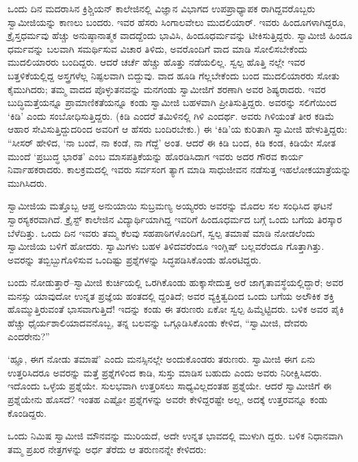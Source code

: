 ಒಂದು ದಿನ ಮದರಾಸಿನ ಕ್ರಿಶ್ಚಿಯನ್ ಕಾಲೇಜಿನಲ್ಲಿ ವಿಜ್ಞಾನ ವಿಭಾಗದ ಉಪಪ್ರಾಧ್ಯಾಪಕ ರಾಗಿದ್ದವರೊಬ್ಬರು ಸ್ವಾಮೀಜಿಯನ್ನು ಕಾಣಲು ಬಂದರು. ಇವರ ಹೆಸರು ಸಿಂಗಾಲವೇಲು ಮುದಲಿಯಾರ್. ಇವರು ಹಿಂದೂಗಳಾಗಿದ್ದರೂ, ಕ್ರೈಸ್ತಧರ್ಮವು ಹೆಚ್ಚು ಅನುಷ್ಠಾನಾತ್ಮಕ ವಾದದ್ದೆಂದು ಭಾವಿಸಿ, ಹಿಂದೂಧರ್ಮವನ್ನು ಟೀಕಿಸುತ್ತಿದ್ದರು. ಸ್ವಾಮೀಜಿ ಹಿಂದೂ ಧರ್ಮವನ್ನು ಬಲವಾಗಿ ಸಮರ್ಥಿಸುವ ವಿಚಾರ ತಿಳಿದು, ಅವರೊಂದಿಗೆ ವಾದ ಮಾಡಿ ಸೋಲಿಸಬೇಕೆಂದು ಮುದಲಿಯಾರರು ಬಂದಿದ್ದರು. ಆದರೆ ಚರ್ಚೆ ಹೆಚ್ಚು ಹೊತ್ತು ನಡೆಯಲಿಲ್ಲ. ಸ್ವಲ್ಪ ಹೊತ್ತಿ ನಲ್ಲೇ ಇವರ ಬತ್ತಳಿಕೆಯಲ್ಲಿದ್ದ ಅಸ್ತ್ರಗಳೆಲ್ಲ ನಿಷ್ಫಲವಾಗಿ ಬಿದ್ದುವು. ವಾದ ಹೂಡಿ ಗೆಲ್ಲಬೇಕೆಂದು ಬಂದ ಮುದಲಿಯಾರರು ಸೋತು ಕೈಮುಗಿದರು; ತಮ್ಮ ವಾದದ ಪೊಳ್ಳುತನವನ್ನು ಮನಗಂಡು ಸ್ವಾಮೀಜಿಗೆ ಶರಣಾಗಿ ಅವರ ಶಿಷ್ಯರಾದರು. ಇವರ ಬುದ್ಧಿಮತ್ತೆಯನ್ನೂ ಪ್ರಾಮಾಣಿಕತೆಯನ್ನೂ ಕಂಡು ಸ್ವಾಮೀಜಿ ಬಹಳವಾಗಿ ಪ್ರೀತಿಸುತ್ತಿದ್ದರು. ಅವರನ್ನು ಸಲಿಗೆಯಿಂದ ‘ಕಿಡಿ’ ಎಂದು ಸಂಬೋಧಿಸುತ್ತಿದ್ದರು. (ಕಿಡಿ ಎಂದರೆ ತಮಿಳಿನಲ್ಲಿ ಗಿಳಿ ಎಂದರ್ಥ. ಅವರು ಗಿಳಿಯಂತೆ ತೀರ ಕಡಿಮೆ ಆಹಾರ ಸೇವಿಸುತ್ತಿದ್ದುದರಿಂದ ಅವರಿಗೆ ಆ ಹೆಸರು ಬಂದಿರಬೇಕು.) ಈ ‘ಕಿಡಿ’ಯ ಕುರಿತಾಗಿ ಸ್ವಾಮೀಜಿ ಹೇಳುತ್ತಿದ್ದರು: “ಸೀಸರ್ ಹೇಳಿದ, ‘ನಾ ಬಂದೆ, ನಾ ಕಂಡೆ, ನಾ ಗೆದ್ದೆ’ ಅಂತ. ಆದರೆ ಈ ಕಿಡಿ ಬಂದ, ಕಿಡಿ ಕಂಡ, ಕಿಡಿಯೇ ಸೋತ  ಮುಂದೆ ‘ಪ್ರಬುದ್ಧ ಭಾರತ’ ಎಂಬ ಮಾಸಪತ್ರಿಕೆಯನ್ನು ಹೊರಡಿಸಿದಾಗ ಇವರು ಅದರ ಗೌರವ ಕಾರ್ಯ ನಿರ್ವಾಹಕರಾದರು. ಕಾಲಕ್ರಮದಲ್ಲಿ ಇವರು ಸರ್ವಸಂಗ ತ್ಯಾಗ ಮಾಡಿ ಸಾಧುಜೀವನ ನಡೆಸುತ್ತ ಇಹಲೋಕಯಾತ್ರೆಯನ್ನು ಮುಗಿಸಿದರು.

ಸ್ವಾಮೀಜಿಯ ಮತ್ತೊಬ್ಬ ಆಪ್ತ ಅನುಯಾಯಿ ಸುಬ್ರಮಣ್ಯ ಅಯ್ಯರರು ಅವರನ್ನು ಮೊದಲ ಸಲ ಸಂಧಿಸಿದ ಘಟನೆ ಸ್ವಾರಸ್ಯಕರವಾಗಿದೆ. ಕ್ರೈಸ್ಟ್ ಕಾಲೇಜಿನ ವಿದ್ಯಾರ್ಥಿಯಾಗಿದ್ದ ಇವರಿಗೆ ಹಿಂದೂಧರ್ಮದ ಬಗ್ಗೆ ಒಂದು ಬಗೆಯ ತಿರಸ್ಕಾರ ಬೆಳೆದಿತ್ತು. ಒಂದು ದಿನ ಇವರು ತಮ್ಮ ಕೆಲವು ಸಹಪಾಠಿಗಳೊಂದಿಗೆ, ಸ್ವಲ್ಪ ತಮಾಷೆ ಮಾಡಿ ನೋಡಲೆಂದು ಸ್ವಾಮೀಜಿಯ ಬಳಿಗೆ ಹೋದರು. ಸ್ವಾಮಿಗಳು ಬಹಳ ತಿಳಿದವರೆಂದೂ ಇಂಗ್ಲಿಷ್ ಬಲ್ಲವರೆಂದೂ ಗೊತ್ತಾಗಿತ್ತು. ಅವರನ್ನು ತಬ್ಬಿಬ್ಬುಗೊಳಿಸುವ ಒಂದಿಷ್ಟು ಪ್ರಶ್ನೆಗಳನ್ನು ಸಿದ್ಧಪಡಿಸಿಕೊಂಡು ಹೊರಟಿದ್ದರು.

ಬಂದು ನೋಡುತ್ತಾರೆ–ಸ್ವಾಮೀಜಿ ಕುರ್ಚಿಯಲ್ಲಿ ಒರಗಿಕೊಂಡು ಹುಕ್ಕಾಸೇದುತ್ತ ಅರೆ ಜಾಗೃತಾವಸ್ಥೆಯಲ್ಲಿದ್ದಾರೆ; ಅವರ ಮನಸ್ಸು ಯಾವುದೋ ಉನ್ನತ ಪ್ರಜ್ಞೆಯ ಹಂತದಲ್ಲಿ ದ್ದಂತಿದೆ; ಅವರ ವ್ಯಕ್ತಿತ್ವದಿಂದ ಒಂದು ಬಗೆಯ ಅಲೌಕಿಕ ಶಕ್ತಿ ಹೊಮ್ಮುತ್ತಿರುವಂತೆ ಭಾಸವಾಗುತ್ತಿದೆ! ಇದನ್ನು ಕಂಡು ಈ ತರುಣರು ಏಕೋ ಸ್ವಲ್ಪ ಹಿಮ್ಮೆಟ್ಟಿದರು. ಬಳಿಕ ಅವರ ಪೈಕಿ ಹೆಚ್ಚು ಧೈರ್ಯಶಾಲಿಯಾದವನೊಬ್ಬ, ತನ್ನ ಬಲವನ್ನು ಒಗ್ಗೂಡಿಸಿಕೊಂಡು ಕೇಳಿದ, “ಸ್ವಾಮೀಜಿ, ದೇವರು ಎಂದರೇನು?”

‘ಹ್ಞೂ, ಈಗ ನೋಡು ತಮಾಷೆ’ ಎಂದು ಮನಸ್ಸಿನಲ್ಲೇ ಅಂದುಕೊಂಡರು ತರುಣರು. ಸ್ವಾಮೀಜಿ ಈಗ ಏನು ಉತ್ತರಿಸಿದರೂ ಅವರನ್ನು ಮತ್ತೆ ಪ್ರಶ್ನೆಗಳಿಂದ ಕಾಡಿ, ಸುಸ್ತು ಮಾಡಿಸ ಬಹುದು ಎಂದು ಅವರು ನಿರೀಕ್ಷಿಸಿದರು. ಇದೊಂದು ಒಳ್ಳೆಯ ಪ್ರಶ್ನೆಯೇ. ಸುಲಭವಾಗಿ ಉತ್ತರಿಸಲು ಸಾಧ್ಯವಿಲ್ಲದಂತಹ ಪ್ರಶ್ನೆಯೇ. ಆದರೆ ಸ್ವಾಮೀಜಿಗೆ ಈ ಪ್ರಶ್ನೆಯೇನು ಹೊಸದೆ? ಇಂತಹ ಎಷ್ಟೋ ಪ್ರಶ್ನೆಗಳನ್ನು ಅವರೇ ಕೇಳಿದ್ದರಷ್ಟೇ ಅಲ್ಲ, ಅದಕ್ಕೆ ಉತ್ತರವನ್ನೂ ಕಂಡು ಕೊಂಡಿದ್ದರು.

ಒಂದು ನಿಮಿಷ ಸ್ವಾಮೀಜಿ ಮೌನವನ್ನು ಮುರಿಯದೆ, ಅದೇ ಉನ್ನತ ಭಾವದಲ್ಲಿ ಮುಳುಗಿ ದ್ದರು. ಬಳಿಕ ನಿಧಾನವಾಗಿ ತಮ್ಮ ಪ್ರಖರ ನೇತ್ರಗಳನ್ನು ಅರ್ಧ ತೆರೆದು ಆ ತರುಣನನ್ನೇ ಕೇಳಿದರು:

